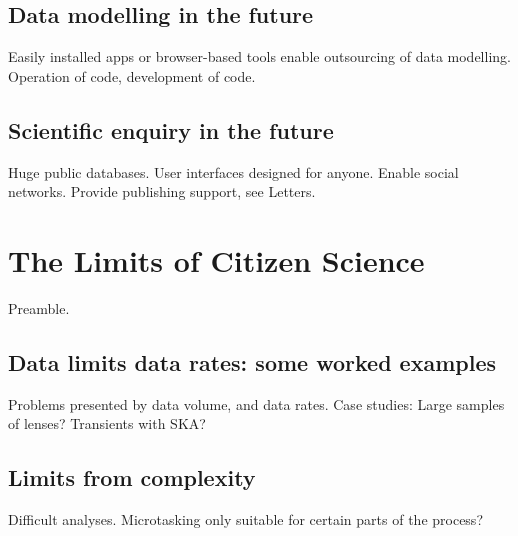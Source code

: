 \documentclass{ar2e}
\begin{document}
\subsection{Data modelling in the future}
\label{sec:future:models}

Easily installed apps or browser-based tools enable outsourcing of data
modelling. Operation of code, development of code.



\subsection{Scientific enquiry in the future}
\label{sec:future:enquiry}

Huge public databases. User interfaces designed for anyone. Enable social
networks. Provide publishing support, see Letters.



\section{The Limits of Citizen Science}
\label{sec:limits}

Preamble.


\subsection{Data limits data rates: some worked examples}
\label{sec:limits:data}

Problems presented by data volume, and data rates. 
Case studies: Large samples of lenses?  Transients with SKA? 



\subsection{Limits from complexity}
\label{sec:limits:complexity}

Difficult analyses. Microtasking only suitable for certain parts of the process?


\end{document}
